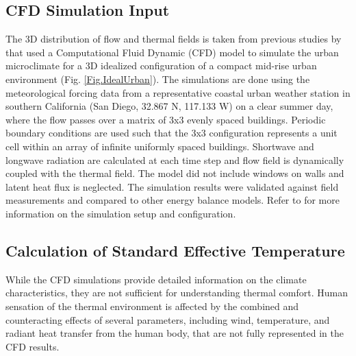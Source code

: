 \documentclass[smallextended]{svjour3}
\begin{document}
\subsection{CFD Simulation Input}
\label{sec:cfd}
The 3D distribution of flow and thermal fields is taken from previous studies by  \citet{nazarian2014effects, nazarian2015cfd} that used a Computational Fluid Dynamic (CFD) model to simulate the urban microclimate for a 3D idealized configuration of a compact mid-rise urban environment (Fig. \ref{Fig.IdealUrban}). The simulations are done using the meteorological forcing data from a representative coastal urban weather station in southern California (San Diego, 32.867 N, 117.133 W) on a clear summer day, where the flow passes over a matrix of 3x3 evenly spaced buildings. Periodic boundary conditions are used such that the 3x3 configuration represents a unit cell within an array of infinite uniformly spaced buildings. Shortwave and longwave radiation are calculated at each time step and flow field is dynamically coupled with the thermal field. The model did not include windows on walls and latent heat flux is neglected. The simulation results were validated against field measurements and compared to other energy balance models. Refer to \cite{nazarian2014effects, nazarian2015cfd} for more information on the simulation setup and configuration.

\subsection{Calculation of Standard Effective Temperature}
\label{sec:set}
While the CFD simulations provide detailed information on the climate characteristics, they are not sufficient for understanding thermal comfort. Human sensation of the thermal environment is affected by the combined and counteracting effects of several parameters, including wind, temperature, and radiant heat transfer from the human body, that are not fully represented in the CFD results. 
\end{document}
